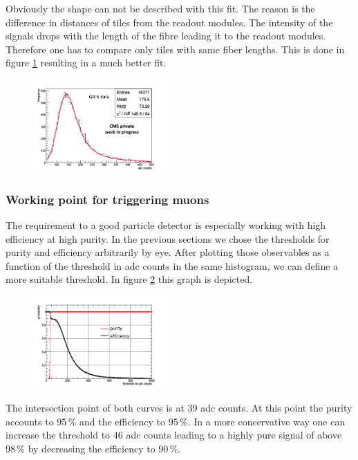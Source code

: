 			Obviously the shape can not be described with this fit.
			The reason is the difference in distances of tiles from the readout modules.
			The intensity of the signals drops with the length of the fibre leading it to the readout modules.
			Therefore one has to compare only tiles with same fiber lengths.
			This is done in figure \ref{fig:langaus_good} resulting in a much better fit.
			\begin{figure}[htbp]
				\centering
				\includegraphics[width=0.45\textwidth]{Figures/erdogan/langaus_good.png}
				\caption{}
				\label{fig:langaus_good}
			\end{figure}
		\subsubsection{Working point for triggering muons}
		\label{working_point}
			The requirement to a good particle detector is especially working with high efficiency at high purity.
			In the previous sections we chose the thresholds for purity and efficiency arbitrarily by eye.
			After plotting those observables as a function of the threshold in adc counts in the same histogram, we can define a more suitable threshold.
			In figure \ref{fig:pur_eff} this graph is depicted.
			\begin{figure}[htbp]
				\centering
				\includegraphics[width=0.45\textwidth]{Figures/erdogan/pur_eff.png}
				\caption{}
				\label{fig:pur_eff}
			\end{figure}
			The intersection point of both curves is at 39 adc counts.
			At this point the purity accounts to 95\,\% and the efficiency to 95\,\%.
			In a more concervative way one can increase the threshold to 46 adc counts leading to a highly pure signal of above 98\,\% by decreasing the efficiency to 90\,\%.